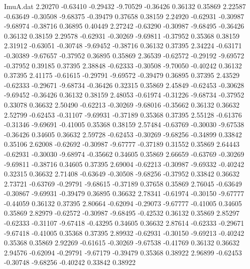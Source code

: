 \begin{filecontents}{ImuA.dat}
   2.20270   -0.63410   -0.29432   -9.70529   -0.36426    0.36132    0.35869
   2.22587   -0.63649   -0.30508   -9.68375   -0.39479    0.37658    0.38159
   2.24920   -0.62931   -0.30987   -9.68974   -0.38716    0.36895    0.40449
   2.27242   -0.63290   -0.30987   -9.68495   -0.36426    0.36132    0.38159
   2.29578   -0.62931   -0.30269   -9.69811   -0.37952    0.35368    0.38159
   2.31912   -0.63051   -0.30748   -9.69452   -0.38716    0.36132    0.37395
   2.34224   -0.63171   -0.30389   -9.67657   -0.37952    0.36895    0.35869
   2.36539   -0.62572   -0.29192   -9.69572   -0.37952    0.39185    0.37395
   2.38848   -0.62333   -0.30508   -9.70050   -0.40242    0.36132    0.37395
   2.41175   -0.61615   -0.29791   -9.69572   -0.39479    0.36895    0.37395
   2.43529   -0.62333   -0.29671   -9.68734   -0.36426    0.32315    0.35869
   2.45849   -0.62453   -0.30628   -9.69452   -0.36426    0.36132    0.38159
   2.48053   -0.61974   -0.31226   -9.68734   -0.37952    0.33078    0.36632
   2.50490   -0.62213   -0.30269   -9.68016   -0.35662    0.36132    0.36632
   2.52799   -0.62453   -0.31107   -9.69931   -0.37189    0.35368    0.37395
   2.55128   -0.61376   -0.31346   -9.69691   -0.41005    0.35368    0.38159
   2.57484   -0.63769   -0.30030   -9.67538   -0.36426    0.34605    0.36632
   2.59728   -0.62453   -0.30269   -9.68256   -0.34899    0.33842    0.35106
   2.62008   -0.62692   -0.30987   -9.67777   -0.37189    0.31552    0.35869
   2.64443   -0.62931   -0.30030   -9.68974   -0.35662    0.34605    0.35869
   2.66659   -0.63769   -0.30269   -9.69811   -0.38716    0.34605    0.37395
   2.69004   -0.62213   -0.30987   -9.69332   -0.40242    0.32315    0.36632
   2.71408   -0.63649   -0.30508   -9.68256   -0.37952    0.33842    0.36632
   2.73721   -0.63769   -0.29791   -9.68615   -0.37189    0.37658    0.35869
   2.76045   -0.63649   -0.30867   -9.69931   -0.39479    0.36895    0.36632
   2.78341   -0.61974   -0.30150   -9.67777   -0.44059    0.36132    0.37395
   2.80664   -0.62094   -0.29073   -9.67777   -0.41005    0.34605    0.35869
   2.82979   -0.62572   -0.30987   -9.68495   -0.42532    0.36132    0.35869
   2.85297   -0.62333   -0.31107   -9.67418   -0.43295    0.34605    0.36632
   2.87614   -0.62333   -0.29671   -9.67418   -0.41005    0.35368    0.37395
   2.89932   -0.62931   -0.30150   -9.69213   -0.40242    0.35368    0.35869
   2.92269   -0.61615   -0.30269   -9.67538   -0.41769    0.36132    0.36632
   2.94576   -0.62094   -0.29791   -9.67179   -0.39479    0.35368    0.38922
   2.96899   -0.62453   -0.30748   -9.68256   -0.40242    0.33842    0.38922

\end{filecontents}
